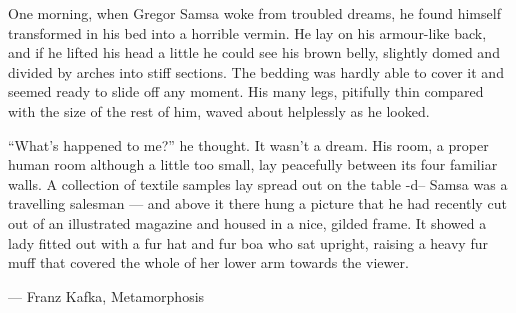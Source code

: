 \documentclass{article}
\begin{document}
  One morning, when Gregor Samsa woke from troubled dreams, he found himself
  transformed in his bed into a horrible vermin. He lay on his armour-like back,
  and if he lifted his head a little he could see his brown belly, slightly
  domed and divided by arches into stiff sections. The bedding was hardly able
  to cover it and seemed ready to slide off any moment. His many legs, pitifully
  thin compared with the size of the rest of him, waved about helplessly as he
  looked.

  ``What's happened to me?'' he thought. It wasn't a dream. His room, a proper
  human room although a little too small, lay peacefully between its four
  familiar walls. A collection of textile samples lay spread out on the table -d--
  Samsa was a travelling salesman --- and above it there hung a picture that he
  had recently cut out of an illustrated magazine and housed in a nice, gilded
  frame. It showed a lady fitted out with a fur hat and fur boa who sat upright,
  raising a heavy fur muff that covered the whole of her lower arm towards the
  viewer.

  --- Franz Kafka, Metamorphosis
\end{document}
